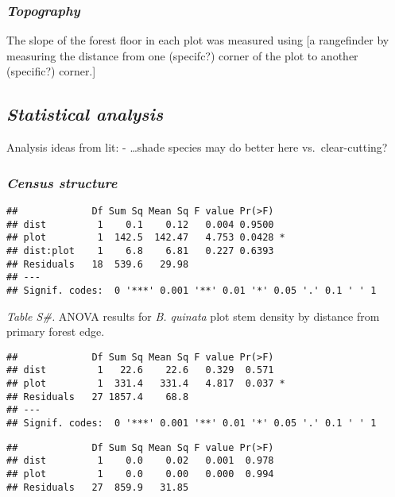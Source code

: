 \documentclass[]{article}
\begin{document}
\hypertarget{topography}{%
\subsubsection{\texorpdfstring{\emph{Topography}}{Topography}}\label{topography}}

The slope of the forest floor in each plot was measured using {[}a
rangefinder by measuring the distance from one (specifc?) corner of the
plot to another (specific?) corner.{]}

\hypertarget{statistical-analysis}{%
\subsection{\texorpdfstring{\emph{Statistical
analysis}}{Statistical analysis}}\label{statistical-analysis}}

Analysis ideas from lit: - \ldots{}shade species may do better here
vs.~clear-cutting?

\hypertarget{census-structure}{%
\subsubsection{\texorpdfstring{\emph{Census
structure}}{Census structure}}\label{census-structure}}

\begin{verbatim}
##             Df Sum Sq Mean Sq F value Pr(>F)  
## dist         1    0.1    0.12   0.004 0.9500  
## plot         1  142.5  142.47   4.753 0.0428 *
## dist:plot    1    6.8    6.81   0.227 0.6393  
## Residuals   18  539.6   29.98                 
## ---
## Signif. codes:  0 '***' 0.001 '**' 0.01 '*' 0.05 '.' 0.1 ' ' 1
\end{verbatim}

\emph{Table S\#.} ANOVA results for \emph{B. quinata} plot stem density
by distance from primary forest edge.

\begin{verbatim}
##             Df Sum Sq Mean Sq F value Pr(>F)  
## dist         1   22.6    22.6   0.329  0.571  
## plot         1  331.4   331.4   4.817  0.037 *
## Residuals   27 1857.4    68.8                 
## ---
## Signif. codes:  0 '***' 0.001 '**' 0.01 '*' 0.05 '.' 0.1 ' ' 1
\end{verbatim}

\begin{verbatim}
##             Df Sum Sq Mean Sq F value Pr(>F)
## dist         1    0.0    0.02   0.001  0.978
## plot         1    0.0    0.00   0.000  0.994
## Residuals   27  859.9   31.85
\end{verbatim}
\end{document}
